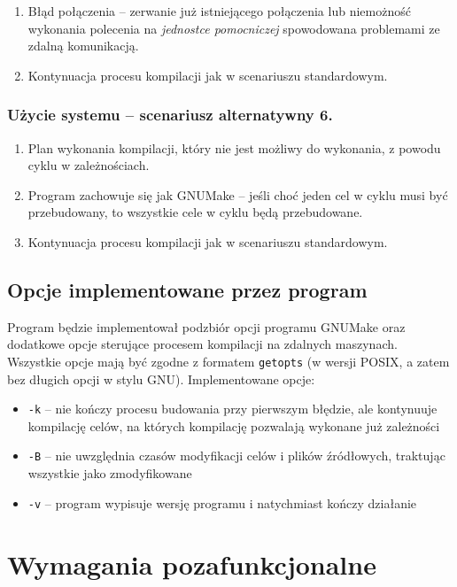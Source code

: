 \documentclass[a4paper]{article}
\begin{document}
\begin{enumerate}
	\item Błąd połączenia -- zerwanie już istniejącego połączenia lub niemożność wykonania polecenia na \emph{jednostce pomocniczej} spowodowana problemami ze zdalną komunikacją.
	\item Kontynuacja procesu kompilacji jak w scenariuszu standardowym.
\end{enumerate}

\subsubsection{Użycie systemu -- scenariusz alternatywny 6.}

\begin{enumerate}
	\item Plan wykonania kompilacji, który nie jest możliwy do wykonania, z powodu cyklu w zależnościach.
	\item Program zachowuje się jak GNUMake -- jeśli choć jeden cel w cyklu musi być przebudowany, to wszystkie cele w cyklu będą przebudowane.
	\item Kontynuacja procesu kompilacji jak w scenariuszu standardowym.
\end{enumerate}

\subsection{Opcje implementowane przez program}

Program będzie implementował podzbiór opcji programu GNUMake oraz dodatkowe opcje sterujące procesem kompilacji na zdalnych maszynach.
Wszystkie opcje mają być zgodne z formatem \verb+getopts+ (w wersji POSIX, a zatem bez długich opcji w stylu GNU).
Implementowane opcje:

\begin{itemize}
	\item \verb+-k+ -- nie kończy procesu budowania przy pierwszym błędzie, ale kontynuuje kompilację celów, na których kompilację pozwalają wykonane już zależności
	\item \verb+-B+ -- nie uwzględnia czasów modyfikacji celów i plików źródłowych, traktując wszystkie jako zmodyfikowane
	\item \verb+-v+ -- program wypisuje wersję programu i natychmiast kończy działanie
\end{itemize}

\section{Wymagania pozafunkcjonalne}
\end{document}
